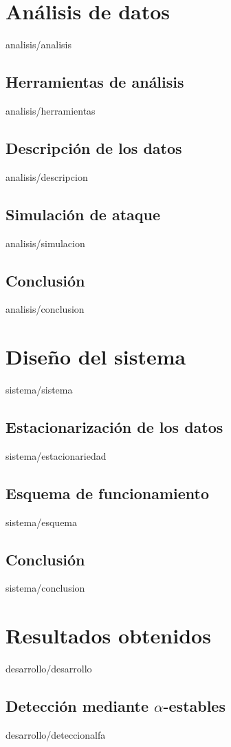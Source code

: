 \documentclass[epsbased,copyright,final,printable,covers,extendedindex,firstnumbered,tfg,gnuplot]{tfgtfmthesisuam}
\begin{document}
\chapter{An\'alisis de datos\label{CAP:ANALISIS}}{analisis/analisis}
  \section{Herramientas de an\'alisis\label{SEC:HERRAMIENTAS}}{analisis/herramientas}
  \section{Descripci\'on de los datos\label{SEC:DESCRIPCION}}{analisis/descripcion}
  \section{Simulaci\'on de ataque\label{SEC:SIMULACION}}{analisis/simulacion}
  \section{Conclusi\'on\label{SEC:ADCONCLUSION}}{analisis/conclusion}

\chapter{Dise\~no del sistema\label{CAP:SISTEMA}}{sistema/sistema}
  \section{Estacionarizaci\'on de los datos\label{SEC:ESTACIONARIEDAD}}{sistema/estacionariedad}
  \section{Esquema de funcionamiento\label{SEC:ESQUEMA}}{sistema/esquema}
  \section{Conclusi\'on\label{SEC:SDCONCLUSION}}{sistema/conclusion}

\chapter{Resultados obtenidos\label{CAP:DESARROLLO}}{desarrollo/desarrollo}
\section{Detecci\'on mediante $\alpha$-estables\label{SEC:DETECCIONALFA}}{desarrollo/deteccionalfa}
\end{document}
